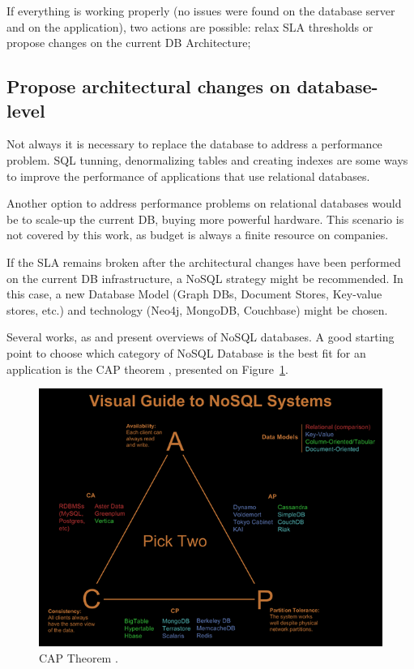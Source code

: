 If everything is working properly (no issues were found on the database server and on the application), two actions are possible: relax SLA thresholds or propose changes on the current DB Architecture;

\subsection{Propose architectural changes on database-level} 

Not always it is necessary to replace the database to address a performance problem. SQL tunning, denormalizing tables and creating indexes are some ways to improve the performance of applications that use relational databases.

Another option to address performance problems on relational databases would be to scale-up the current DB, buying more powerful hardware. This scenario is not covered by this work, as budget is always a finite resource on companies.

If the SLA remains broken after the architectural changes have been performed on the current DB infrastructure, a NoSQL strategy might be recommended. In this case, a new Database Model (Graph DBs, Document Stores, Key-value stores, etc.) and technology (Neo4j, MongoDB, Couchbase) might be chosen.

Several works, as \cite{6106531} and \cite{5410700} present overviews of NoSQL databases. A good starting point to choose which category of NoSQL Database is the best fit for an application is the CAP theorem \cite{nosqlthoughtworks}, presented on Figure~\ref{fig:cap}. 

\begin{figure}[ht!]
\centering
\includegraphics[width=120mm]{Imagens/cap.png}
\caption{CAP Theorem \cite{captheorem}.\label{fig:cap}}
\end{figure}

